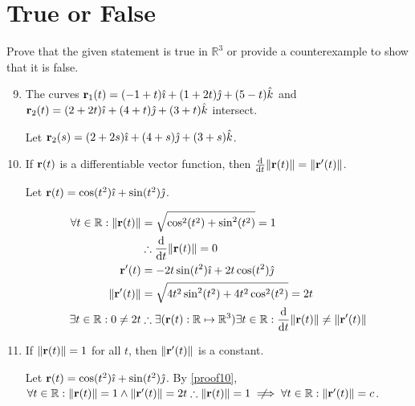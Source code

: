 \documentclass[11pt]{article}
\newcommand{\nimplies}{\mathrel{{\ooalign{\hidewidth$\not\phantom{=}$\hidewidth\cr$\implies$}}}}
\renewcommand{\vec}[1]{\ensuremath\mathbf{#1}}
\begin{document}
\newpage
\section*{True or False}
Prove that the given statement is true in \(\mathbb{R}^3\) or provide a counterexample to show that it is false.

\begin{enumerate}
  \setcounter{enumi}{8}
\item The curves \(\vec{r}_1(t) = (-1 + t)\hat{\imath} + (1 + 2t)\hat{\jmath} +
  (5 - t)\hat{k}\) and \(\vec{r}_2(t) = (2 + 2t)\hat{\imath} + (4 +
  t)\hat{\jmath} + (3 + t)\hat{k}\) intersect.

  Let \(\vec{r}_2(s) = (2 + 2s)\hat{\imath} + (4 + s)\hat{\jmath} + (3 +
  s)\hat{k}\).

  \item If \(\vec{r}(t)\) is a differentiable vector function, then
    \(\frac{\mathrm{d}}{\mathrm{d}t} \lVert \vec{r}(t) \rVert = \lVert
    \vec{r}'(t) \rVert\). \label{proof10}

    Let \(\vec{r}(t) = \cos(t^2)\hat{\imath} + \sin(t^2)\hat{\jmath}\).

    \begin{align*}
      \forall t \in \mathbb{R} : \lVert \vec{r}(t) \rVert
      &= \sqrt{\cos^2(t^2) + \sin^2(t^2)} = 1 \\
      &\therefore \frac{\mathrm{d}}{\mathrm{d}t} \lVert \vec{r}(t) \rVert = 0 \\
      \vec{r}'(t)
      &= -2t \sin(t^2)\hat{\imath} + 2t\cos(t^2)\hat{\jmath} \\
      \lVert \vec{r}'(t) \rVert
      &= \sqrt{4t^2\sin^2(t^2) + 4t^2\cos^2(t^2)} = 2t \\
      \exists t \in \mathbb{R} : 0 \neq 2t
      &\therefore \exists(\vec{r}(t) : \mathbb{R} \mapsto \mathbb{R}^3) \exists
        t \in \mathbb{R} : \frac{\mathrm{d}}{\mathrm{d}t} \lVert \vec{r}(t)
        \rVert \neq \lVert \vec{r}'(t) \rVert
    \end{align*}

    \item If \(\lVert \vec{r}(t) \rVert = 1\) for all \(t\), then \(\lVert
      \vec{r}'(t) \rVert\) is a constant.

      Let \(\vec{r}(t) = \cos(t^2)\hat{\imath} + \sin(t^2)\hat{\jmath}\). By
      \cref{proof10}, \(\forall t \in \mathbb{R} : \lVert \vec{r}(t) \rVert = 1
      \land \lVert \vec{r}'(t) \rVert = 2t \therefore \lVert \vec{r}(t) \rVert =
      1 \nimplies \forall t \in \mathbb{R} : \lVert \vec{r}'(t) \rVert = c\).
\end{enumerate}
\end{document}
